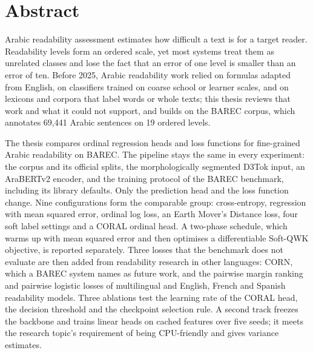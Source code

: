 \documentclass[12pt]{report}
\begin{document}
\clearpage
\chapter*{Abstract}
Arabic readability assessment estimates how difficult a text is for a target reader. Readability
levels form an ordered scale, yet most systems treat them as unrelated classes and lose the fact
that an error of one level is smaller than an error of ten. Before 2025, Arabic readability work
relied on formulas adapted from English, on classifiers trained on coarse school or learner
scales, and on lexicons and corpora that label words or whole texts; this thesis reviews that
work and what it could not support, and builds on the BAREC corpus, which annotates 69,441 Arabic
sentences on 19 ordered levels.

The thesis compares ordinal regression heads and loss functions for fine-grained Arabic
readability on BAREC. The pipeline stays the same in every experiment: the corpus and its
official splits, the morphologically segmented D3Tok input, an AraBERTv2 encoder, and the
training protocol of the BAREC benchmark, including its library defaults. Only the prediction
head and the loss function change. Nine configurations form the comparable group: cross-entropy,
regression with mean squared error, ordinal log loss, an Earth Mover's Distance loss, four soft
label settings and a CORAL ordinal head. A two-phase schedule, which warms up with mean squared
error and then optimises a differentiable Soft-QWK objective, is reported separately. Three
losses that the benchmark does not evaluate are then added from readability research in other
languages: CORN, which a BAREC system names as future work, and the pairwise margin ranking and
pairwise logistic losses of multilingual and English, French and Spanish readability models.
Three ablations test the learning rate of the CORAL head, the decision threshold and the
checkpoint selection rule. A second track freezes the backbone and trains linear heads on cached
features over five seeds; it meets the research topic's requirement of being CPU-friendly and
gives variance estimates.
\end{document}
